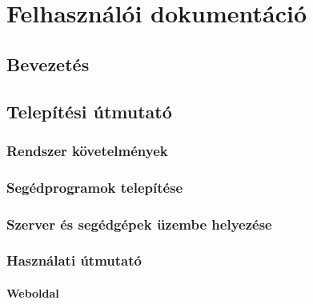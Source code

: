 \documentclass{elteikthesis}
\begin{document}
\chapter{Felhasználói dokumentáció}
	\begin{comment}
	A Felhasználói dokumentáció tartalmazza
	- a megoldott probléma rövid megfogalmazását,
	- a felhasznált módszerek rövid leírását,
	- a program használatához szükséges összes információt

	Magába foglalja a telepítési- (vagy üzemeltetési-) és a végfelhasználói leírást. Ezek
	meghatározott célközönséghez szólnak, könnyen és gyorsan kell, hogy eligazítsák a
	felhasználót a program használatában!

\end{comment}
\section{Bevezetés}
\section{Telepítési útmutató}
\subsection{Rendszer követelmények}
\subsection{Segédprogramok telepítése}
\subsection{Szerver és segédgépek üzembe helyezése}
\subsection{Használati útmutató}
\subsubsection{Weboldal}
\end{document}
